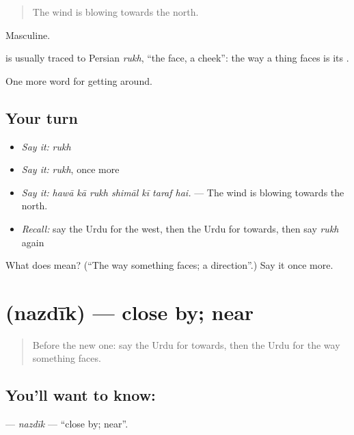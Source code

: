 \begin{quote}
The wind is blowing towards the north.
\end{quote}

Masculine.

\begin{cousinweb}
is usually traced to Persian \emph{rukh}, \textquotedblleft{}the face, a cheek\textquotedblright{}: the way a thing faces is its \textbf{}.
\end{cousinweb}

\begin{grammarlens}[title={What you've built}]
One more word for getting around.
\end{grammarlens}

\subsection*{Your turn}
\begin{itemize}
\raggedright
  \item \emph{Say it:} \emph{rukh}
  \item \emph{Say it:} \emph{rukh}, once more
  \item \emph{Say it:} \emph{hawā kā rukh shimāl kī taraf hai.} — The wind is blowing towards the north.
  \item \emph{Recall:} say the Urdu for the west, then the Urdu for towards, then say \emph{rukh} again
\end{itemize}

\begin{tcolorbox}[breakable,colback=teal!4,colframe=teal!35!black,title={Before you move on}]
What does  mean? (\textquotedblleft{}The way something faces; a direction\textquotedblright{}.) Say it once more.
\end{tcolorbox}
\section[\texorpdfstring{\ur{نزدیک} (nazdīk)}{نزدیک (nazdīk)}]{ (nazdīk) — close by; near}

\label{lesson:UR-C409-nazdik}



\begin{quote}
Before the new one: say the Urdu for towards, then the Urdu for the way something faces.
\end{quote}

\subsection*{You'll want to know: }
\textbf{} — \emph{nazdīk} — \textquotedblleft{}close by; near\textquotedblright{}.

